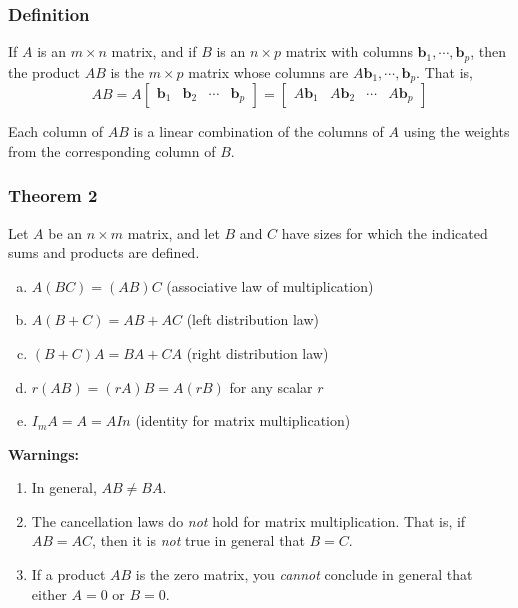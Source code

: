 \documentclass[letterpaper,11pt]{article}
\begin{document}
			\subsubsection{Definition}
				If $A$ is an $m\times n$ matrix, and if $B$ is an $n\times p$ matrix with columns $\mathbf{b}_1,\cdots,\mathbf{b}_p$, then the product $AB$ is the $m\times p$ matrix whose columns are $A\mathbf{b}_1,\cdots,\mathbf{b}_p$. That is,
				\begin{equation}
					AB=A
					\begin{bmatrix}
						\mathbf{b}_1 & \mathbf{b}_2 & \cdots & \mathbf{b}_p
					\end{bmatrix}=
					\begin{bmatrix}
						A\mathbf{b}_1 & A\mathbf{b}_2 & \cdots & A\mathbf{b}_p
					\end{bmatrix}
				\end{equation}
				
				Each column of $AB$ is a linear combination of the columns of $A$ using the weights from the corresponding column of $B$.
			
			\subsubsection{Theorem 2}
				Let $A$ be an $n\times m$ matrix, and let $B$ and $C$ have sizes for which the indicated sums and products are defined.
				\begin{enumerate}[a.]
					\item $A(BC)=(AB)C$		(associative law of multiplication)
					\item $A(B+C)=AB+AC$	(left distribution law)
					\item $(B+C)A=BA+CA$	(right distribution law)
					\item $r(AB)=(rA)B=A(rB)$ for any scalar $r$
					\item $I_mA=A=AIn$		(identity for matrix multiplication)
				\end{enumerate}
				
				\textbf{Warnings:}
				\begin{enumerate}
					\item In general, $AB\neq BA$.
					\item The cancellation laws do \textit{not} hold for matrix multiplication. That is, if $AB=AC$, then it is \textit{not} true in general that $B=C$.
					\item If a product $AB$ is the zero matrix, you \textit{cannot} conclude in general that either $A=0$ or $B=0$.
				\end{enumerate}
\end{document}
